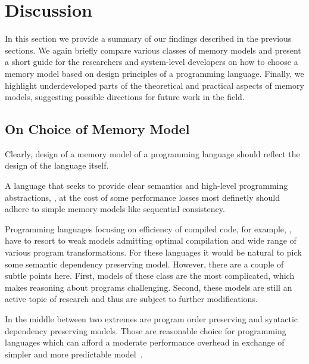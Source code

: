 \section{Discussion}
\label{sec:discussion}

In this section we provide a summary of our findings described in the previous sections. 
We again briefly compare various classes of memory models 
and present a short guide for the researchers and system-level developers 
on how to choose a memory model based on 
design principles of a programming language.   
Finally, we highlight underdeveloped parts of the theoretical
and practical aspects of memory models, suggesting 
possible directions for future work in the field. 

\subsection{On Choice of  Memory Model}

Clearly, design of a memory model of a programming language
should reflect the design of the language itself. 

A language that seeks to provide clear semantics and 
high-level programming abstractions, \eg \Haskell, at the cost 
of some performance losses most definetly should 
adhere to simple memory models like sequential consistency. 

Programming languages focusing on efficiency 
of compiled code, for example, \CPP, 
have to resort to weak models admitting 
optimal compilation and wide range of 
various program transformations. 
For these languages it would be natural 
to pick some semantic dependency preserving model. 
However, there are a couple of subtle points here. 
First, models of these class are the most complicated, 
which makes reasoning about programs challenging. 
Second, these models are still an active topic 
of research and thus are subject to further modifications.

In the middle between two extremes are program order preserving and 
syntactic dependency preserving models.
Those are reasonable choice for programming languages
which can afford a moderate performance overhead 
in exchange of simpler and more predictable model~\cite{Ou-Demsky:OOPSLA18}.

